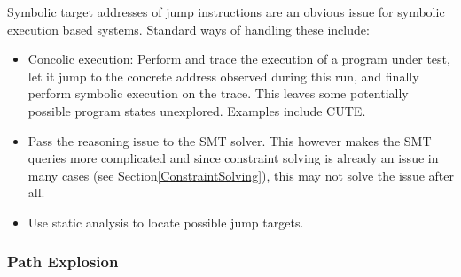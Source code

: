 \documentclass{article}
\begin{document}
Symbolic target addresses of jump instructions are an obvious issue for symbolic execution based systems. Standard ways of handling these include:
\begin{itemize}
  \item Concolic execution: Perform and trace the execution of a program under test, let it jump to the concrete address observed during this run, and finally perform symbolic execution on the trace. This leaves some potentially possible program states unexplored. Examples include CUTE\cite{CUTE}.
  \item Pass the reasoning issue to the SMT solver. This however makes the SMT queries more complicated and since constraint solving is already an issue in many cases (see Section\ref{ConstraintSolving}), this may not solve the issue after all.
  \item Use static analysis to locate possible jump targets.
\end{itemize}

\subsubsection{Path Explosion}
\end{document}
